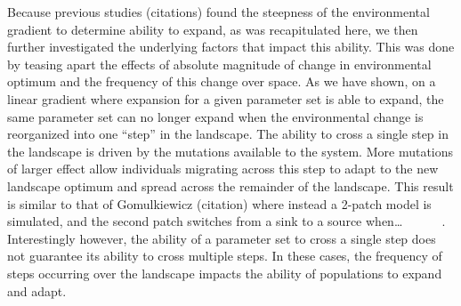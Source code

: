Because previous studies (citations) found the steepness of the environmental gradient to 
determine ability to expand, as was recapitulated here, we then further investigated the underlying 
factors that impact this ability. This was done by teasing apart the effects of absolute magnitude 
of change in environmental optimum and the frequency of this change over space. As we have shown, 
on a linear gradient where expansion for a given parameter set is able to expand, the same 
parameter set can no longer expand when the environmental change is reorganized into one “step” 
in the landscape.
	The ability to cross a single step in the landscape is driven by the mutations available 
	to the system. More mutations of larger effect allow individuals migrating across this 
	step to adapt to the new landscape optimum and spread across the remainder of the landscape. 
	This result is similar to that of Gomulkiewicz (citation) where instead a 2-patch model 
	is simulated, and the second patch switches from a sink to a source when… ~~~~~ .
	Interestingly however, the ability of a parameter set to cross a single step does not 
	guarantee its ability to cross multiple steps. In these cases, the frequency of steps 
	occurring over the landscape impacts the ability of populations to expand and adapt.





